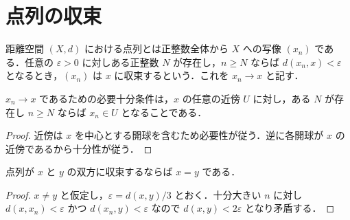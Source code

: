 \section{点列の収束}
\begin{defn}[点列とその収束]
距離空間 $(X,d)$ における点列とは正整数全体から $X$ への写像 $(x_n)$ である．任意の $\varepsilon>0$ に対しある正整数 $N$ が存在し，$n\geq N$ ならば $d(x_n,x)<\varepsilon$ となるとき，$(x_n)$ は $x$ に収束するという．これを $x_n\to x$ と記す．
\end{defn}
\begin{prop}[収束の近傍による判定]
$x_n\to x$ であるための必要十分条件は，$x$ の任意の近傍 $U$ に対し，ある $N$ が存在し $n\geq N$ ならば $x_n\in U$ となることである．
\end{prop}
\begin{proof}
近傍は $x$ を中心とする開球を含むため必要性が従う．逆に各開球が $x$ の近傍であるから十分性が従う．
\end{proof}
\begin{prop}[極限の一意性]
点列が $x$ と $y$ の双方に収束するならば $x=y$ である．
\end{prop}
\begin{proof}
$x\ne y$ と仮定し，$\varepsilon=d(x,y)/3$ とおく．十分大きい $n$ に対し $d(x,x_n)<\varepsilon$ かつ $d(x_n,y)<\varepsilon$ なので $d(x,y)<2\varepsilon$ となり矛盾する．
\end{proof}
